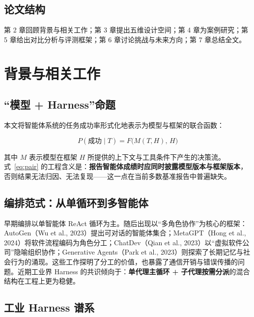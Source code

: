 \documentclass[11pt,a4paper]{ctexart}
\begin{document}
\subsection{论文结构}

第 2 章回顾背景与相关工作；第 3 章提出五维设计空间；第 4 章为案例研究；第 5 章给出对比分析与评测框架；第 6 章讨论挑战与未来方向；第 7 章总结全文。

\section{背景与相关工作}

\subsection{“模型 + Harness”命题}

本文将智能体系统的任务成功率形式化地表示为模型与框架的联合函数：

\begin{equation}
P(\text{成功}\mid T) = F\bigl(M(T,H),\, H\bigr)
\label{eq:pair}
\end{equation}

其中 $M$ 表示模型在框架 $H$ 所提供的上下文与工具条件下产生的决策流。式~\eqref{eq:pair} 的工程含义是：\textbf{报告智能体成绩时应同时披露模型版本与框架版本}，否则结果无法归因、无法复现——这一点在当前多数基准报告中普遍缺失。

\subsection{编排范式：从单循环到多智能体}

早期编排以单智能体 ReAct 循环为主。随后出现以“多角色协作”为核心的框架：AutoGen（Wu et al., 2023）提出可对话的智能体集合；MetaGPT（Hong et al., 2024）将软件流程编码为角色分工；ChatDev（Qian et al., 2023）以“虚拟软件公司”隐喻组织协作；Generative Agents（Park et al., 2023）则探索了长期记忆与社会行为的涌现。这些工作探明了分工的价值，也暴露了通信开销与错误传播的问题。近期工业界 Harness 的共识倾向于：\textbf{单代理主循环 + 子代理按需分派}的混合结构在工程上更为稳健。

\subsection{工业 Harness 谱系}
\end{document}

